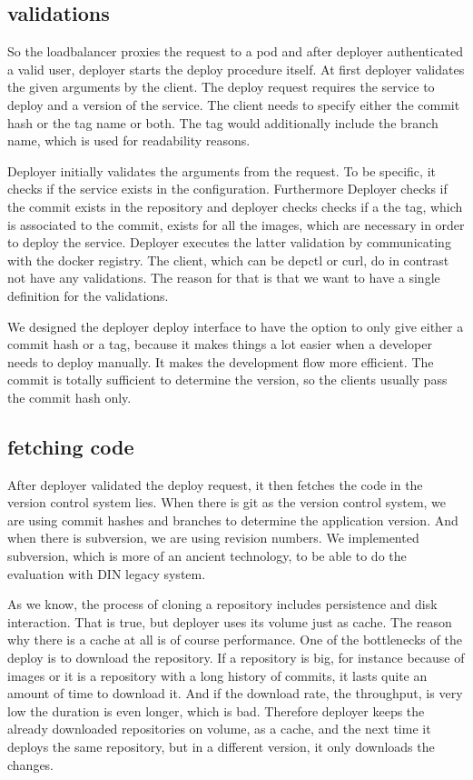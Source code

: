 \subsection{validations}
So the loadbalancer proxies the request to a pod and after deployer authenticated a valid
user, deployer starts the deploy procedure itself. At first deployer validates the given
arguments by the client. The deploy request requires the service to deploy and a version
of the service. The client needs to specify either the commit hash or the tag name or
both. The tag would additionally include the branch name, which is used for readability
reasons.

Deployer initially validates the arguments from the request. To be specific, it checks if
the service exists in the configuration. Furthermore Deployer checks if the commit exists
in the repository and deployer checks checks if a the tag, which is associated to the
commit, exists for all the images, which are necessary in order to deploy the
service. Deployer executes the latter validation by communicating with the docker
registry. The client, which can be depctl or curl, do in contrast not have any
validations. The reason for that is that we want to have a single definition for the
validations.

We designed the deployer deploy interface to have the option to only give either a commit
hash or a tag, because it makes things a lot easier when a developer needs to deploy
manually. It makes the development flow more efficient. The commit is totally sufficient
to determine the version, so the clients usually pass the commit hash only.

\subsection{fetching code}
After deployer validated the deploy request, it then fetches the code in the version
control system lies. When there is git as the version control system, we are using commit
hashes and branches to determine the application version. And when there is subversion, we
are using revision numbers. We implemented subversion, which is more of an ancient
technology, to be able to do the evaluation with DIN legacy system.

As we know, the process of cloning a repository includes persistence and disk
interaction. That is true, but deployer uses its volume just as cache. The reason why
there is a cache at all is of course performance. One of the bottlenecks of the deploy is
to download the repository. If a repository is big, for instance because of images or it
is a repository with a long history of commits, it lasts quite an amount of time to
download it. And if the download rate, the throughput, is very low the duration is even
longer, which is bad. Therefore deployer keeps the already downloaded repositories on
volume, as a cache, and the next time it deploys the same repository, but in a different
version, it only downloads the changes.

